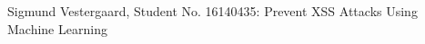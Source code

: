 \documentclass[10pt,journal,compsoc]{IEEEtran}
\begin{document}
% 
%



%
{Sigmund Vestergaard, Student No. 16140435: Prevent XSS Attacks Using Machine Learning}
% 



\end{document}
